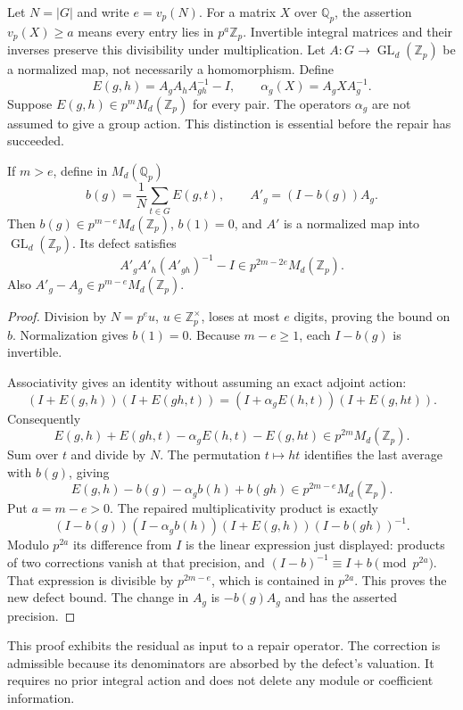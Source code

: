 Let $N=|G|$ and write $e=v_p(N)$. For a matrix $X$ over $\mathbb Q_p$, the assertion $v_p(X)\geq a$ means every entry lies in $p^a\mathbb Z_p$. Invertible integral matrices and their inverses preserve this divisibility under multiplication. Let $A:G\to\operatorname{GL}_d(\mathbb Z_p)$ be a normalized map, not necessarily a homomorphism. Define
\[
 E(g,h)=A_gA_hA_{gh}^{-1}-I,
 \qquad \alpha_g(X)=A_gXA_g^{-1}.
\]
Suppose $E(g,h)\in p^mM_d(\mathbb Z_p)$ for every pair. The operators $\alpha_g$ are not assumed to give a group action. This distinction is essential before the repair has succeeded.

\begin{lemma}\label{lem:quadratic-repair}
If $m>e$, define in $M_d(\mathbb Q_p)$
\[
 b(g)=\frac1N\sum_{t\in G}E(g,t),\qquad
 A'_g=(I-b(g))A_g.
\]
Then $b(g)\in p^{m-e}M_d(\mathbb Z_p)$, $b(1)=0$, and $A'$ is a normalized map into $\operatorname{GL}_d(\mathbb Z_p)$. Its defect satisfies
\[
 \boxed{A'_gA'_h(A'_{gh})^{-1}-I\in
 p^{2m-2e}M_d(\mathbb Z_p).}
\]
Also $A'_g-A_g\in p^{m-e}M_d(\mathbb Z_p)$.
\end{lemma}
\begin{proof}
Division by $N=p^eu$, $u\in\mathbb Z_p^\times$, loses at most $e$ digits, proving the bound on $b$. Normalization gives $b(1)=0$. Because $m-e\geq1$, each $I-b(g)$ is invertible.

Associativity gives an identity without assuming an exact adjoint action:
\[
 (I+E(g,h))(I+E(gh,t))
 = (I+\alpha_g E(h,t))(I+E(g,ht)).
\]
Consequently
\[
 E(g,h)+E(gh,t)-\alpha_g E(h,t)-E(g,ht)
 \in p^{2m}M_d(\mathbb Z_p).
\]
Sum over $t$ and divide by $N$. The permutation $t\mapsto ht$ identifies the last average with $b(g)$, giving
\[
 E(g,h)-b(g)-\alpha_g b(h)+b(gh)
 \in p^{2m-e}M_d(\mathbb Z_p).
\]
Put $a=m-e>0$. The repaired multiplicativity product is exactly
\[
 (I-b(g))(I-\alpha_g b(h))(I+E(g,h))(I-b(gh))^{-1}.
\]
Modulo $p^{2a}$ its difference from $I$ is the linear expression just displayed: products of two corrections vanish at that precision, and $(I-b)^{-1}\equiv I+b\pmod{p^{2a}}$. That expression is divisible by $p^{2m-e}$, which is contained in $p^{2a}$. This proves the new defect bound. The change in $A_g$ is $-b(g)A_g$ and has the asserted precision.
\end{proof}

This proof exhibits the residual as input to a repair operator. The correction is admissible because its denominators are absorbed by the defect's valuation. It requires no prior integral action and does not delete any module or coefficient information.

